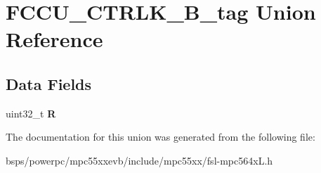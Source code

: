 \hypertarget{unionFCCU__CTRLK__32B__tag}{}\section{F\+C\+C\+U\+\_\+\+C\+T\+R\+L\+K\+\_\+B\+\_\+tag Union Reference}
\label{unionFCCU__CTRLK__32B__tag}
\subsection*{Data Fields}
\begin{DoxyCompactItemize}
\item 
\mbox{\label{unionFCCU__CTRLK__32B__tag_a21e641d41739c20e954388ceda0f0d75}} 
uint32\+\_\+t {\bfseries R}
\end{DoxyCompactItemize}


The documentation for this union was generated from the following file\+:\begin{DoxyCompactItemize}
\item 
bsps/powerpc/mpc55xxevb/include/mpc55xx/fsl-\/mpc564x\+L.\+h\end{DoxyCompactItemize}
